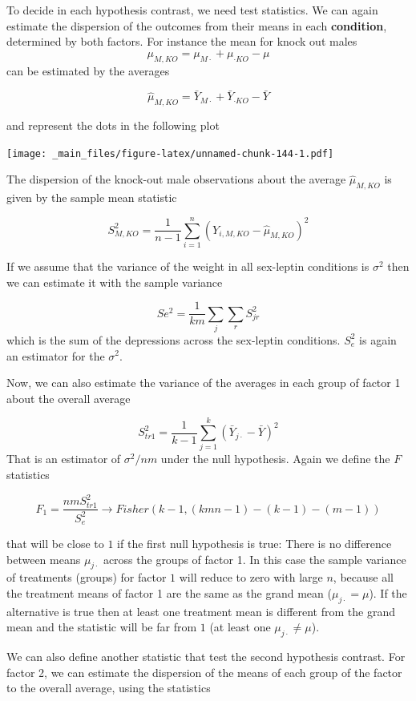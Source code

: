 \documentclass[
]{book}
\begin{document}
To decide in each hypothesis contrast, we need test statistics. We can again estimate the dispersion of the outcomes from their means in each \textbf{condition}, determined by both factors. For instance the mean for knock out males \[\mu_{M,KO}=\mu_{M \cdot} + \mu_{\cdot KO} - \mu\] can be estimated by the averages

\[\hat{\mu}_{M,KO}= \bar{Y}_{M \cdot}+\bar{Y}_{\cdot KO} - \bar{Y}\]

and represent the dots in the following plot

\texttt{[image: \_main\_files/figure-latex/unnamed-chunk-144-1.pdf]}

The dispersion of the knock-out male observations about the average \(\hat{\mu}_{M,KO}\) is given by the sample mean statistic

\[S^2_{M,KO}=\frac{1}{n-1}\sum_{i=1}^n (Y_{i,M,KO}-\hat{\mu}_{M,KO})^2\]

If we assume that the variance of the weight in all sex-leptin conditions is \(\sigma^2\) then we can estimate it with the sample variance

\[Se^2= \frac{1}{km}\sum_j \sum_r S^2_{jr}\]
which is the sum of the depressions across the sex-leptin conditions. \(S_e^2\) is again an estimator for the \(\sigma^2\).

Now, we can also estimate the variance of the averages in each group of factor 1 about the overall average

\[S^2_{tr1}=\frac{1}{k-1} \sum_{j=1}^k(\bar{Y}_{j\cdot}-\bar{Y})^2\]
That is an estimator of \(\sigma^2/nm\) under the null hypothesis. Again we define the \(F\) statistics

\[F_1=\frac{nmS_{tr1}^2}{S_{e}^2} \rightarrow Fisher(k-1,(kmn-1)-(k-1)-(m-1))\]

that will be close to \(1\) if the first null hypothesis is true: There is no difference between means \(\mu_{j\cdot}\) across the groups of factor 1. In this case the sample variance of treatments (groups) for factor \(1\) will reduce to zero with large \(n\), because all the treatment means of factor 1 are the same as the grand mean (\(\mu_{j\cdot}=\mu\)). If the alternative is true then at least one treatment mean is different from the grand mean and the statistic will be far from \(1\) (at least one \(\mu_{j\cdot}\neq\mu\)).

We can also define another statistic that test the second hypothesis contrast. For factor 2, we can estimate the dispersion of the means of each group of the factor to the overall average, using the statistics
\end{document}
